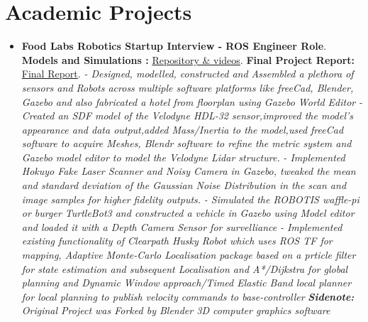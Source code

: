 \documentclass[a4paper,12pt]{article}
\begin{document}
\section*{Academic Projects}
\begin{itemize}
    \item{\textbf{\large{Food Labs Robotics Startup Interview - ROS Engineer Role}}.
    \newline
    \textbf{ Models and Simulations :} \href{https://github.com/teetangh/Kaustav-ROS-Workspace}{Repository \& videos}.
    \textbf{  Final Project Report:} \href{https://github.com/teetangh/Kaustav-ROS-Workspace/blob/master/Resources/Final%20Report.pdf}{Final Report}.
    \newline
    \textit{- Designed, modelled, constructed and
    Assembled a plethora of sensors and Robots across multiple software platforms like
    freeCad, Blender, Gazebo and also fabricated a hotel from floorplan using Gazebo World Editor}
    \newline
    \textit{- Created an SDF model of the Velodyne HDL-32 sensor,improved the model's appearance and data output,added Mass/Inertia to the model,used freeCad software to acquire Meshes, Blendr software to refine the metric system and Gazebo model editor to model the Velodyne Lidar structure.}
    \newline
    \textit{- Implemented Hokuyo Fake Laser Scanner and Noisy Camera in Gazebo, tweaked the mean and standard deviation of the Gaussian Noise Distribution in the scan and image samples for higher fidelity outputs.}
    \newline
    \textit{- Simulated the ROBOTIS waffle-pi or burger TurtleBot3 and constructed a vehicle in Gazebo using Model editor and loaded it with a Depth Camera Sensor for survelliance}
    \newline
    \textit{- Implemented existing functionality of Clearpath Husky Robot which uses ROS TF for mapping, Adaptive Monte-Carlo Localisation package based on a prticle filter for state estimation and subsequent Localisation and A*/Dijkstra for global planning and Dynamic Window approach/Timed Elastic Band local planner for local planning to publish velocity commands to base-controller}
    \newline
    \textit{\textbf{Sidenote:} Original Project was Forked by Blender 3D computer graphics software }}
    \newline


\end{itemize}
\end{document}
